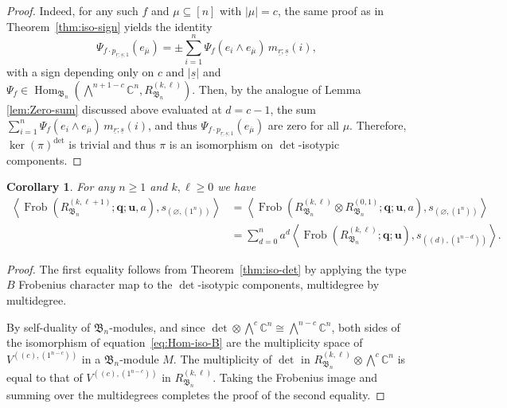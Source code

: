 \documentclass[11pt, reqno]{amsart}
\newtheorem{corollary}[theorem]{Corollary}
\theoremstyle{definition}
\theoremstyle{remark}
\numberwithin{equation}{section}
\newcommand{\0}{\emptyset}
\newcommand{\C}{\mathbb{C}}
\renewcommand{\r}{\underline{r}}
\newcommand{\s}{\underline{s}}
\DeclareMathOperator{\Frob}{Frob}
\DeclareMathOperator{\Hom}{Hom}
\begin{document}
\begin{proof}
Indeed, for any such $f$ and $\mu \subseteq [n]$ with $|\mu| = c$, the same proof as in 
Theorem~\ref{thm:iso-sign} yields the identity 
   \begin{equation*}
        \Psi_{f \cdot p_{\r;\s;1}}(e_{\overline{\mu}}) = \pm \sum_{i=1}^n \Psi_f(e_i \wedge e_{\overline{\mu}})\, m_{\r;\s}(i),
    \end{equation*}
    with a sign depending only on $c$ and $|\s|$ and $\Psi_f \in 
    \Hom_{\mathfrak{B}_n} \left(\bigwedge\nolimits^{n+1-c} \C^n, 
    R_{\mathfrak{B}_n}^{(k,\ell)}\right)$. 
    Then, by the analogue of Lemma \ref{lem:Zero-sum} discussed above 
    evaluated at $d=c-1$, the sum 
    $\sum_{i=1}^n \Psi_f(e_i \wedge e_{\overline{\mu}})\, m_{\r;\s}(i)$, 
    and thus $\Psi_{f \cdot p_{\r;\s;1}}(e_{\overline{\mu}})$ 
    are zero for all $\mu$. Therefore, $\ker(\pi)^{\det}$ is trivial 
    and thus $\pi$ is an isomorphism on $\det$-isotypic components. 
\end{proof}

\begin{corollary}\label{cor:hook-to-sign-sf-B}
    For any $n \geq 1$ and $k, \ell \geq 0$ we have
    \begin{equation*}
    \begin{aligned}
        \left\langle 
        \Frob\left(R_{\mathfrak{B}_n}^{(k,\ell+1)}; 
        \mathbf{q}; \mathbf{u}, a\right), s_{(\varnothing, (1^n))} 
        \right\rangle
        &= \left\langle 
        \Frob\left(R_{\mathfrak{B}_n}^{(k,\ell)} \otimes R_{\mathfrak{B}_n}^{(0,1)}; 
        \mathbf{q}; \mathbf{u}, a\right), s_{(\varnothing,(1^n))} 
        \right\rangle \\
        &= \sum_{d=0}^{n} a^d \left\langle 
        \Frob\left(R_{\mathfrak{B}_n}^{(k,\ell)}; \mathbf{q}; \mathbf{u}\right), 
        s_{((d),(1^{n-d}))} \right\rangle. 
    \end{aligned}
    \end{equation*}
\end{corollary}

\begin{proof}
    The first equality follows from Theorem~\ref{thm:iso-det} by applying the type $B$ Frobenius character map to the $\det$-isotypic components, multidegree by multidegree.

    By self-duality of $\mathfrak{B}_n$-modules, and since $\det \otimes \bigwedge^c \C^n \cong \bigwedge^{n-c} \C^n$, both sides of the isomorphism of equation~\eqref{eq:Hom-iso-B} are the multiplicity space of $V^{((c),(1^{n-c}))}$ in a $\mathfrak{B}_n$-module $M$. 
    The multiplicity of $\det$ in $R_{\mathfrak{B}_n}^{(k,\ell)} \otimes \bigwedge^c \C^n$ is equal to that of $V^{((c),(1^{n-c}))}$ in $R_{\mathfrak{B}_n}^{(k,\ell)}$.
    Taking the Frobenius image and summing over the multidegrees completes the proof of the second equality.
\end{proof}
\end{document}
